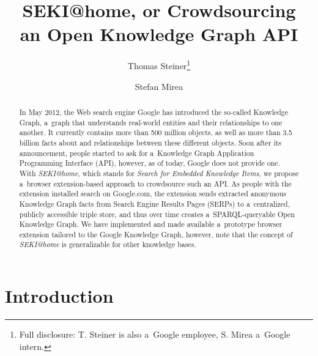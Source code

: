\documentclass[runningheads,a4paper]{llncs}
\begin{document}
\title{SEKI@home, or Crowdsourcing\\ an Open Knowledge Graph API}

\author{
  Thomas Steiner\thanks{Full disclosure: T. Steiner is also a~Google employee, S. Mirea a~Google intern.} \and
  Stefan Mirea
}


\maketitle
\setcounter{footnote}{0}

\begin{abstract}
In May 2012, the Web search engine Google has introduced the so-called Knowledge Graph,
a~graph that understands real-world entities and their relationships to one another.
It currently contains more than 500 million objects,
as well as more than 3.5 billion facts about
and relationships between these different objects.
Soon after its announcement, people started to ask
for a~Knowledge Graph Application Programming Interface (API),
however, as of today, Google does not provide one.
With \emph{SEKI@home}, which stands for \emph{Search for Embedded Knowledge Items},
we propose a~browser extension-based approach to crowdsource such an API.
As people with the extension installed search on Google.com,
the extension sends extracted anonymous Knowledge Graph facts from Search Engine Results Pages (SERPs)
to a~centralized, publicly accessible triple store,
and thus over time creates a~SPARQL-queryable Open Knowledge Graph.
We have implemented and made available a~prototype browser extension
tailored to the Google Knowledge Graph, however,
note that the concept of \emph{SEKI@home} is generalizable for other knowledge bases.
\end{abstract}

\section{Introduction}
\end{document}
